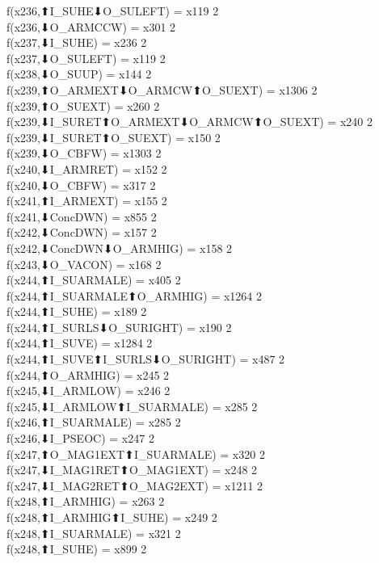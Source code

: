 f(x236,⬆I_SUHE⬇O_SULEFT) = x119 {2} \\
f(x236,⬇O_ARMCCW) = x301 {2} \\
f(x237,⬇I_SUHE) = x236 {2} \\
f(x237,⬇O_SULEFT) = x119 {2} \\
f(x238,⬇O_SUUP) = x144 {2} \\
f(x239,⬆O_ARMEXT⬇O_ARMCW⬆O_SUEXT) = x1306 {2} \\
f(x239,⬆O_SUEXT) = x260 {2} \\
f(x239,⬇I_SURET⬆O_ARMEXT⬇O_ARMCW⬆O_SUEXT) = x240 {2} \\
f(x239,⬇I_SURET⬆O_SUEXT) = x150 {2} \\
f(x239,⬇O_CBFW) = x1303 {2} \\
f(x240,⬇I_ARMRET) = x152 {2} \\
f(x240,⬇O_CBFW) = x317 {2} \\
f(x241,⬆I_ARMEXT) = x155 {2} \\
f(x241,⬇ConcDWN) = x855 {2} \\
f(x242,⬇ConcDWN) = x157 {2} \\
f(x242,⬇ConcDWN⬇O_ARMHIG) = x158 {2} \\
f(x243,⬇O_VACON) = x168 {2} \\
f(x244,⬆I_SUARMALE) = x405 {2} \\
f(x244,⬆I_SUARMALE⬆O_ARMHIG) = x1264 {2} \\
f(x244,⬆I_SUHE) = x189 {2} \\
f(x244,⬆I_SURLS⬇O_SURIGHT) = x190 {2} \\
f(x244,⬆I_SUVE) = x1284 {2} \\
f(x244,⬆I_SUVE⬆I_SURLS⬇O_SURIGHT) = x487 {2} \\
f(x244,⬆O_ARMHIG) = x245 {2} \\
f(x245,⬇I_ARMLOW) = x246 {2} \\
f(x245,⬇I_ARMLOW⬆I_SUARMALE) = x285 {2} \\
f(x246,⬆I_SUARMALE) = x285 {2} \\
f(x246,⬇I_PSEOC) = x247 {2} \\
f(x247,⬆O_MAG1EXT⬆I_SUARMALE) = x320 {2} \\
f(x247,⬇I_MAG1RET⬆O_MAG1EXT) = x248 {2} \\
f(x247,⬇I_MAG2RET⬆O_MAG2EXT) = x1211 {2} \\
f(x248,⬆I_ARMHIG) = x263 {2} \\
f(x248,⬆I_ARMHIG⬆I_SUHE) = x249 {2} \\
f(x248,⬆I_SUARMALE) = x321 {2} \\
f(x248,⬆I_SUHE) = x899 {2} \\
